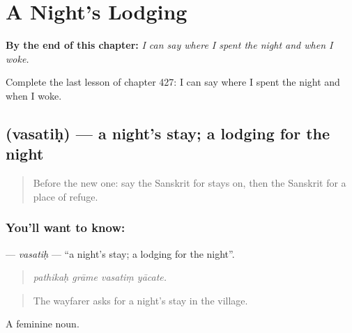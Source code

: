 
\chapter{A Night's Lodging}
\label{ch:sa-a-night-s-lodging}

\begin{chapteropening}
\textbf{By the end of this chapter:} \emph{I can say where I spent the night and when I woke.}

Complete the last lesson of chapter 427: I can say where I spent the night and when I woke.
\end{chapteropening}

\section[\texorpdfstring{\sk{वसतिः} (vasatiḥ)}{वसतिः (vasatiḥ)}]{ (vasatiḥ) — a night's stay; a lodging for the night}

\label{lesson:SA-C427-vasatih}



\begin{quote}
Before the new one: say the Sanskrit for stays on, then the Sanskrit for a place of refuge.
\end{quote}

\subsection*{You'll want to know: }
\textbf{} — \emph{vasatiḥ} — \textquotedblleft{}a night's stay; a lodging for the night\textquotedblright{}.

\begin{quote}
   
\end{quote}

\begin{quote}
\emph{pathikaḥ grāme vasatiṃ yācate.}
\end{quote}

\begin{quote}
The wayfarer asks for a night's stay in the village.
\end{quote}

A feminine noun.


